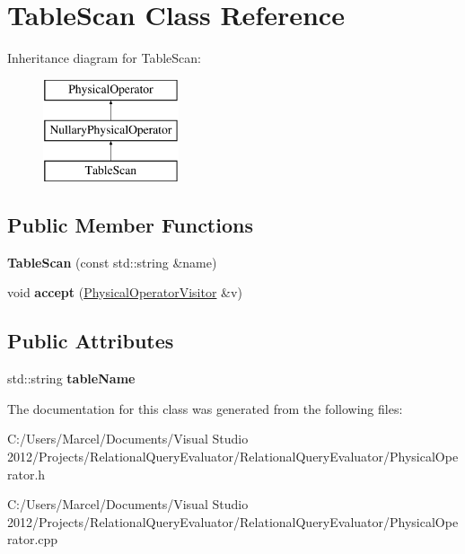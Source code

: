 \hypertarget{class_table_scan}{\section{Table\+Scan Class Reference}
\label{class_table_scan}
}
Inheritance diagram for Table\+Scan\+:\begin{figure}[H]
\begin{center}
\leavevmode
\includegraphics[height=3.000000cm]{class_table_scan}
\end{center}
\end{figure}
\subsection*{Public Member Functions}
\begin{DoxyCompactItemize}
\item 
\hypertarget{class_table_scan_a25018f9d7a3c6b0d0389403ec81cc862}{{\bfseries Table\+Scan} (const std\+::string \&name)}\label{class_table_scan_a25018f9d7a3c6b0d0389403ec81cc862}

\item 
\hypertarget{class_table_scan_a51a770478fbad11e95ad5f91dd7af31a}{void {\bfseries accept} (\hyperlink{class_physical_operator_visitor}{Physical\+Operator\+Visitor} \&v)}\label{class_table_scan_a51a770478fbad11e95ad5f91dd7af31a}

\end{DoxyCompactItemize}
\subsection*{Public Attributes}
\begin{DoxyCompactItemize}
\item 
\hypertarget{class_table_scan_a8ac51489c963d33273bfa178a5c033c1}{std\+::string {\bfseries table\+Name}}\label{class_table_scan_a8ac51489c963d33273bfa178a5c033c1}

\end{DoxyCompactItemize}


The documentation for this class was generated from the following files\+:\begin{DoxyCompactItemize}
\item 
C\+:/\+Users/\+Marcel/\+Documents/\+Visual Studio 2012/\+Projects/\+Relational\+Query\+Evaluator/\+Relational\+Query\+Evaluator/Physical\+Operator.\+h\item 
C\+:/\+Users/\+Marcel/\+Documents/\+Visual Studio 2012/\+Projects/\+Relational\+Query\+Evaluator/\+Relational\+Query\+Evaluator/Physical\+Operator.\+cpp\end{DoxyCompactItemize}
